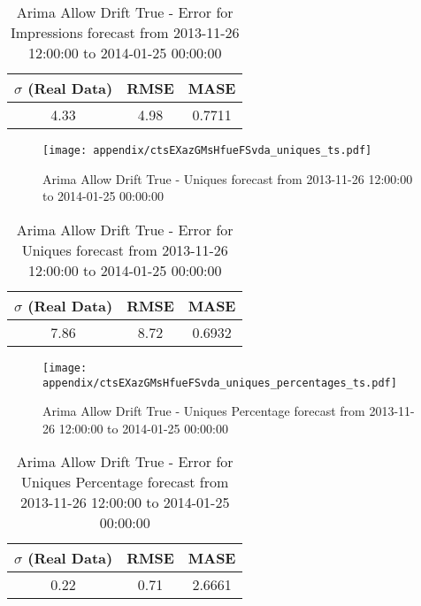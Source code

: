 \begin{table}[H]
\centering
\footnotesize
\begin{tabular}{ccc}
$\sigma$ (Real Data) & RMSE & MASE   \\ \hline
4.33 & 4.98 & 0.7711 \\
\end{tabular}

\vspace{0.5cm}

\caption{
Arima Allow Drift True - Error for Impressions forecast from 2013-11-26 12:00:00 to 2014-01-25 00:00:00}
\end{table}

\begin{figure}[H] \begin{center} \leavevmode
\texttt{[image: appendix/ctsEXazGMsHfueFSvda\_uniques\_ts.pdf]} \caption{
Arima Allow Drift True - Uniques forecast from 2013-11-26 12:00:00 to 2014-01-25 00:00:00} \label{fig:appendix/ctsEXazGMsHfueFSvda_uniques_ts.pdf} \end{center}
\end{figure}

\begin{table}[H]
\centering
\footnotesize
\begin{tabular}{ccc}
$\sigma$ (Real Data) & RMSE & MASE   \\ \hline
7.86 & 8.72 & 0.6932 \\
\end{tabular}

\vspace{0.5cm}

\caption{
Arima Allow Drift True - Error for Uniques forecast from 2013-11-26 12:00:00 to 2014-01-25 00:00:00}
\end{table}

\begin{figure}[H] \begin{center} \leavevmode
\texttt{[image: appendix/ctsEXazGMsHfueFSvda\_uniques\_percentages\_ts.pdf]} \caption{
Arima Allow Drift True - Uniques Percentage forecast from 2013-11-26 12:00:00 to 2014-01-25 00:00:00} \label{fig:appendix/ctsEXazGMsHfueFSvda_uniques_percentages_ts.pdf} \end{center}
\end{figure}

\begin{table}[H]
\centering
\footnotesize
\begin{tabular}{ccc}
$\sigma$ (Real Data) & RMSE & MASE   \\ \hline
0.22 & 0.71 & 2.6661 \\
\end{tabular}

\vspace{0.5cm}

\caption{
Arima Allow Drift True - Error for Uniques Percentage forecast from 2013-11-26 12:00:00 to 2014-01-25 00:00:00}
\end{table}

